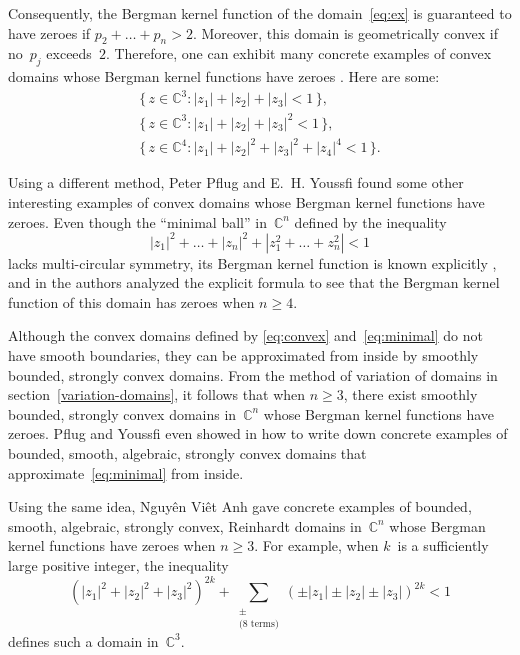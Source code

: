 \documentclass[12pt]{amsart}
\theoremstyle{definition}
\newcommand{\C}{\mathbb{C}}
\begin{document}
Consequently, the Bergman kernel function of the
domain~\eqref{eq:ex} is guaranteed to have zeroes if
\(p_2+\dots+p_n >2\). Moreover, this domain is geometrically
convex if no~\(p_j\) exceeds~\(2\).  Therefore, one can exhibit
many concrete examples of convex domains whose Bergman kernel
functions have zeroes \cite{boasfustraube}. Here are some:
\begin{equation}
\label{eq:convex}
\begin{gathered}
\{\,z\in\C^3: |z_1|+|z_2|+|z_3|<1\,\}, \\
\{\,z\in\C^3: |z_1|+|z_2|+|z_3|^2<1\,\}, \\
\{\,z\in\C^4: |z_1|+|z_2|^2+|z_3|^2+|z_4|^4<1\,\}.
\end{gathered}
\end{equation}

Using a different method, Peter Pflug and E.~H. Youssfi found
some other interesting examples of convex domains whose Bergman
kernel functions have zeroes.  Even though the ``minimal ball''
in~\(\C^n\) defined by the inequality
\begin{equation}
\label{eq:minimal}
  |z_1|^2+\dots+|z_n|^2 + |z_1^2+\dots+z_n^2| <1
\end{equation}
lacks multi-circular symmetry, its Bergman kernel function is
known explicitly \cite{opy}, and in \cite{pflugyoussfi} the
authors analyzed the explicit formula to see that the Bergman
kernel function of this domain has zeroes when \(n\ge4\).

Although the convex domains defined by \eqref{eq:convex}
and~\eqref{eq:minimal} do not have smooth boundaries, they can be
approximated from inside by smoothly bounded, strongly convex
domains.  From the method of variation of domains in
section~\ref{variation-domains}, it follows that when \(n\ge3\),
there exist smoothly bounded, strongly convex domains in~\(\C^n\)
whose Bergman kernel functions have zeroes.  Pflug and Youssfi
even showed in \cite{pflugyoussfi} how to write down concrete
examples of bounded, smooth, algebraic, strongly convex domains
that approximate~\eqref{eq:minimal} from inside.

Using the same idea, Nguy\^en Vi\^et Anh \cite{anh} gave concrete
examples of bounded, smooth, algebraic, strongly convex,
Reinhardt domains in~\(\C^n\) whose Bergman kernel functions have
zeroes when \(n\ge3\). For example, when \(k\)~is a sufficiently
large positive integer, the inequality
\begin{equation}
\label{eq:alg}
(|z_1|^2+|z_2|^2+|z_3|^2)^{2k} + \sum_{\substack{ \pm \\ \text{(8
terms)}}} (\pm |z_1| \pm |z_2| \pm |z_3|)^{2k} <1
\end{equation}
defines such a domain in~\(\C^3\).  
\end{document}

